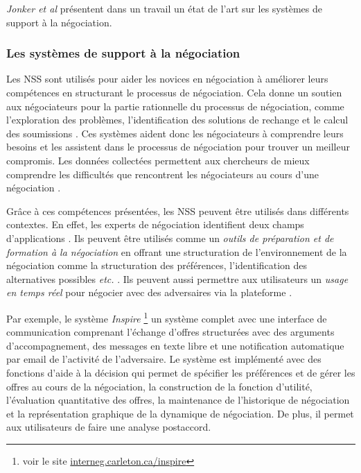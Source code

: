 		\textit{Jonker et al} \cite{jonker2012negotiating} présentent dans un travail un état de l'art sur les systèmes de support à la négociation.
		
		\subsubsection{Les systèmes de support à la négociation}   \label{sec:1nss}
		
		Les NSS sont utilisés pour aider les novices en négociation à améliorer leurs compétences en structurant le processus de négociation. Cela donne un soutien aux négociateurs pour la partie rationnelle du processus de négociation, comme l'exploration des problèmes, l'identification des solutions de rechange et le calcul des soumissions \cite{hindriks2008creating}. Ces systèmes aident donc les négociateurs à comprendre leurs besoins et les assistent dans le processus de négociation pour trouver un meilleur compromis. Les données collectées permettent aux chercheurs de mieux comprendre les difficultés que rencontrent les négociateurs au cours d'une négociation \cite{jonker2012negotiating}. 
		
		Grâce à ces compétences présentées, les NSS peuvent être utilisés dans différents contextes. En effet, les experts de négociation identifient deux champs d'applications \cite{pommeranz2009design}. Ils peuvent être utilisés comme un \textit{outils de préparation et de formation à la négociation} en offrant une structuration de l'environnement de la négociation comme la structuration des préférences, l'identification des alternatives possibles \emph{etc.} \cite{broekens2010affective}.  Ils peuvent aussi permettre aux utilisateurs un \textit{usage en temps réel} pour négocier avec des adversaires via la plateforme \cite{pommeranz2009design}. 
		
		Par exemple, le système \emph{Inspire} \footnote{ voir le site \url{interneg.carleton.ca/inspire}} un système complet avec une interface de communication comprenant l'échange d'offres structurées avec des arguments d'accompagnement, des messages en texte libre et une notification automatique par email de l'activité de l'adversaire. Le système est implémenté avec des fonctions d'aide à la décision qui permet de spécifier les préférences et de gérer les offres au cours de la négociation, la construction de la fonction d'utilité, l'évaluation quantitative des offres, la maintenance de l'historique de négociation et la représentation graphique de la dynamique de négociation. De plus, il permet aux utilisateurs de faire une analyse postaccord. 
		
